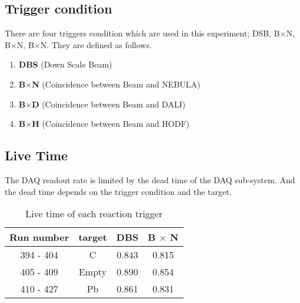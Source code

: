 \subsection{Trigger condition}
There are four triggers condition which are used in this experiment; DSB, B$\times$N, B$\times$N, B$\times$N. They are defined as follows.
\begin{enumerate}
    \item \textbf{DBS} (Down Scale Beam) 
    \item \textbf{B$\times$N} (Coincidence between Beam and NEBULA)
    \item \textbf{B$\times$D} (Coincidence between Beam and DALI)
    \item \textbf{B$\times$H} (Coincidence between Beam and HODF)
\end{enumerate} 

\subsection{Live Time}
The DAQ readout rate is limited by the dead time of the DAQ sub-system. And the dead time depends on the trigger condition and the target.  
\begin{table}[h]
    \centering
    \begin{tabular}{c|c|cc}
        \hline
        Run number & target & DBS & B $\times$ N  \\
        \hline
        394 - 404 & C & 0.843 & 0.815 \\
        405 - 409 & Empty & 0.890 & 0.854 \\
        410 - 427 & Pb & 0.861 & 0.831 \\
        \hline
    \end{tabular}
    \caption{Live time of each reaction trigger}
\end{table}

